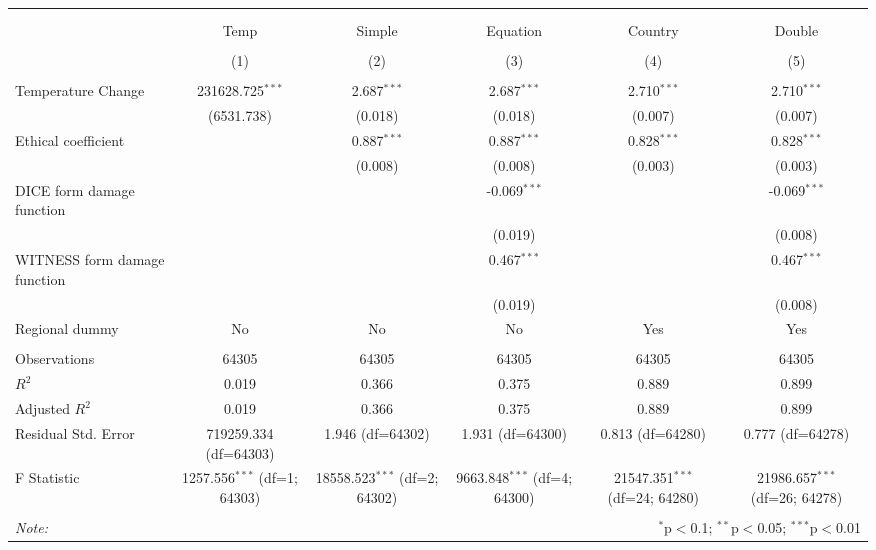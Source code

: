 \begin{table}[!htbp] \centering
\begin{tabular}{@{\extracolsep{5pt}}lccccc}
\\[-1.8ex]\hline
\hline \\[-1.8ex]
\\[-1.8ex] & \multicolumn{1}{c}{Temp} & \multicolumn{1}{c}{Simple} & \multicolumn{1}{c}{Equation} & \multicolumn{1}{c}{Country} & \multicolumn{1}{c}{Double}  \\
\\[-1.8ex] & (1) & (2) & (3) & (4) & (5) \\
\hline \\[-1.8ex]
 Temperature Change & 231628.725$^{***}$ & 2.687$^{***}$ & 2.687$^{***}$ & 2.710$^{***}$ & 2.710$^{***}$ \\
& (6531.738) & (0.018) & (0.018) & (0.007) & (0.007) \\[2em]
 Ethical coefficient & & 0.887$^{***}$ & 0.887$^{***}$ & 0.828$^{***}$ & 0.828$^{***}$ \\
& & (0.008) & (0.008) & (0.003) & (0.003) \\[2em]
 DICE form damage function & & & -0.069$^{***}$ & & -0.069$^{***}$ \\
& & & (0.019) & & (0.008) \\[2em]
 WITNESS form damage function & & & 0.467$^{***}$ & & 0.467$^{***}$ \\
& & & (0.019) & & (0.008) \\[2em]
 Regional dummy & No & No & No & Yes & Yes \\
\hline \\[-1.8ex]
 Observations & 64305 & 64305 & 64305 & 64305 & 64305 \\
 $R^2$ & 0.019 & 0.366 & 0.375 & 0.889 & 0.899 \\
 Adjusted $R^2$ & 0.019 & 0.366 & 0.375 & 0.889 & 0.899 \\
 Residual Std. Error & 719259.334 (df=64303) & 1.946 (df=64302) & 1.931 (df=64300) & 0.813 (df=64280) & 0.777 (df=64278) \\
 F Statistic & 1257.556$^{***}$ (df=1; 64303) & 18558.523$^{***}$ (df=2; 64302) & 9663.848$^{***}$ (df=4; 64300) & 21547.351$^{***}$ (df=24; 64280) & 21986.657$^{***}$ (df=26; 64278) \\
\hline
\hline \\[-1.8ex]
\textit{Note:} & \multicolumn{5}{r}{$^{*}$p$<$0.1; $^{**}$p$<$0.05; $^{***}$p$<$0.01} \\
\end{tabular}
\end{table}